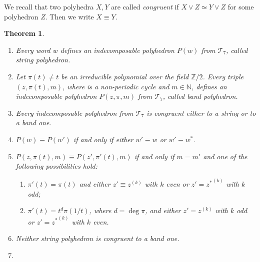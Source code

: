 \documentclass[12pt,a4paper]{amsart}
\newtheorem{theorem}{Theorem}[section]
\theoremstyle{definition}
\theoremstyle{remark}
\numberwithin{equation}{section}
\begin{document}
   We recall that two polyhedra $X,Y$ are called \emph{congruent} if
   $X\vee Z\simeq Y\vee Z$ for some polyhedron $Z$. Then we write
   $X\equiv Y$.

   \begin{theorem}\label{main}
     \begin{enumerate}
      \item  Every word $w$ defines an indecomposable polyhedron $P(w)$ from
       ${\mathscr T}_7$, called \emph{string polyhedron}.
      \item  Let $\pi(t)\ne t$ be an irreducible polynomial over the
     field ${\mathbb Z}/2$. Every triple $(z,\pi(t),m)$, where is a
     non-periodic cycle and $m\in{\mathbb N}$, defines an indecomposable
     polyhedron $P(z,\pi,m)$ from ${\mathscr T}_7$, called \emph{band
     polyhedron}.
      \item  Every indecomposable polyhedron from ${\mathscr T}_7$ is congruent
      either to a string or to a band one. 
      \item  $P(w)\equiv P(w')$ {if and only if } either $w'\equiv w$ or $w'\equiv w^*$.
      \item  $P(z,\pi(t),m)\equiv P(z',\pi'(t),m)$ {if and only if } $m=m'$ and one
     of the following possibilities hold:
     \begin{enumerate}
      \item  $\pi'(t)=\pi(t)$ and either $z'\equiv z^{(k)}$ with $k$
      even or $z'={z^*}^{(k)}$ with $k$ odd;
      \item  $\pi'(t)=t^d\pi(1/t)$, where $d=\deg\pi$,  and either
      $z'=z^{(k)}$ with $k$ odd or $z'={z^*}^{(k)}$ with $k$ even.
     \end{enumerate}
      \item  Neither string polyhedron is congruent to a band one.
      \item  
     \end{enumerate}
   \end{theorem}
\end{document}
